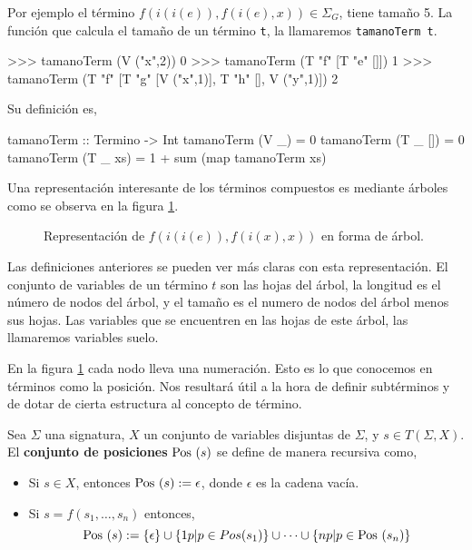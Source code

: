 Por ejemplo el término $f(i(i(e)),f(i(e),x)) \in \Sigma_G$, tiene
tamaño 5.  La función que calcula el tamaño de un término \texttt{t},
la llamaremos \texttt{tamanoTerm t}.

\begin{sesion}
>>> tamanoTerm (V ("x",2))
0
>>> tamanoTerm (T "f" [T "e" []])
1
>>> tamanoTerm (T "f" [T "g" [V ("x",1)], T "h" [], V ("y",1)])
2
\end{sesion}

Su definición es,

\begin{codigo}
tamanoTerm :: Termino -> Int
tamanoTerm (V _)    = 0
tamanoTerm (T _ []) = 0
tamanoTerm (T _ xs) = 1 + sum (map tamanoTerm xs)
\end{codigo}

Una representación interesante de los términos compuestos es mediante
árboles como se observa en la figura \ref{fig:termino}.

\begin{figure}[h]
  \label{fig:termino}
  \centering
  \caption{Representación de $f(i(i(e)),f(i(x),x))$ en forma de
    árbol.}
\end{figure}

Las definiciones anteriores se pueden ver más claras con esta
representación. El conjunto de variables de un término $t$ son las
hojas del árbol, la longitud es el número de nodos del árbol, y el
tamaño es el numero de nodos del árbol menos sus hojas. Las variables
que se encuentren en las hojas de este árbol, las llamaremos variables
suelo.

En la figura \ref{fig:termino} cada nodo lleva una numeración. Esto
es lo que conocemos en términos como la posición. Nos resultará útil a
la hora de definir subtérminos y de dotar de cierta estructura al
concepto de término.

\begin{defi}
  Sea $\Sigma$ una signatura, $X$ un conjunto de variables disjuntas
  de $\Sigma$, y $s \in T(\Sigma, X)$. El \textbf{conjunto de posiciones}
  $\mbox{Pos } (s)$ se define de manera recursiva como,
\begin{itemize}

\item Si $s \in X$, entonces $\mbox{Pos }(s) := {\epsilon}$, donde $\epsilon$
  es la cadena vacía.
\item Si $s = f(s_1, \dots, s_n)$ entonces,
$$ \mbox{Pos }(s) := \{\epsilon\} \cup \{1p | p \in Pos(s_1) \} \cup \dots \cup \{np | p \in \mbox{Pos }(s_n) \}$$
\end{itemize}
\end{defi}

